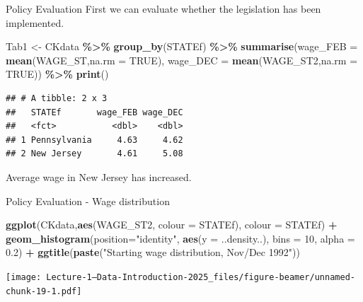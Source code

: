 \documentclass[
  ignorenonframetext,
]{beamer}
\newenvironment{Shaded}{\begin{snugshade}}{\end{snugshade}}
\newcommand{\AttributeTok}[1]{\textcolor[rgb]{0.13,0.29,0.53}{#1}}
\newcommand{\ConstantTok}[1]{\textcolor[rgb]{0.56,0.35,0.01}{#1}}
\newcommand{\DecValTok}[1]{\textcolor[rgb]{0.00,0.00,0.81}{#1}}
\newcommand{\FloatTok}[1]{\textcolor[rgb]{0.00,0.00,0.81}{#1}}
\newcommand{\FunctionTok}[1]{\textcolor[rgb]{0.13,0.29,0.53}{\textbf{#1}}}
\newcommand{\NormalTok}[1]{#1}
\newcommand{\OtherTok}[1]{\textcolor[rgb]{0.56,0.35,0.01}{#1}}
\newcommand{\SpecialCharTok}[1]{\textcolor[rgb]{0.81,0.36,0.00}{\textbf{#1}}}
\newcommand{\StringTok}[1]{\textcolor[rgb]{0.31,0.60,0.02}{#1}}
\begin{document}
\begin{frame}[fragile]{Policy Evaluation}
\label{policy-evaluation}
First we can evaluate whether the legislation has been implemented.

\footnotesize

\begin{Shaded}
\begin{Highlighting}[]
\NormalTok{Tab1 }\OtherTok{\textless{}{-}}\NormalTok{ CKdata }\SpecialCharTok{\%\textgreater{}\%} \FunctionTok{group\_by}\NormalTok{(STATEf) }\SpecialCharTok{\%\textgreater{}\%} 
          \FunctionTok{summarise}\NormalTok{(}\AttributeTok{wage\_FEB =} \FunctionTok{mean}\NormalTok{(WAGE\_ST,}\AttributeTok{na.rm =} \ConstantTok{TRUE}\NormalTok{), }
                    \AttributeTok{wage\_DEC =} \FunctionTok{mean}\NormalTok{(WAGE\_ST2,}\AttributeTok{na.rm =} \ConstantTok{TRUE}\NormalTok{)) }\SpecialCharTok{\%\textgreater{}\%} 
          \FunctionTok{print}\NormalTok{()}
\end{Highlighting}
\end{Shaded}

\begin{verbatim}
## # A tibble: 2 x 3
##   STATEf       wage_FEB wage_DEC
##   <fct>           <dbl>    <dbl>
## 1 Pennsylvania     4.63     4.62
## 2 New Jersey       4.61     5.08
\end{verbatim}

Average wage in New Jersey has increased.

\normalsize
\end{frame}

\begin{frame}[fragile]{Policy Evaluation - Wage distribution}
\label{policy-evaluation---wage-distribution}
\footnotesize

\begin{Shaded}
\begin{Highlighting}[]
\FunctionTok{ggplot}\NormalTok{(CKdata,}\FunctionTok{aes}\NormalTok{(WAGE\_ST2, }\AttributeTok{colour =}\NormalTok{ STATEf), }\AttributeTok{colour =}\NormalTok{ STATEf) }\SpecialCharTok{+} 
    \FunctionTok{geom\_histogram}\NormalTok{(}\AttributeTok{position=}\StringTok{"identity"}\NormalTok{, }
                   \FunctionTok{aes}\NormalTok{(}\AttributeTok{y =}\NormalTok{ ..density..),}
                   \AttributeTok{bins =} \DecValTok{10}\NormalTok{,}
                   \AttributeTok{alpha =} \FloatTok{0.2}\NormalTok{) }\SpecialCharTok{+}
    \FunctionTok{ggtitle}\NormalTok{(}\FunctionTok{paste}\NormalTok{(}\StringTok{"Starting wage distribution, Nov/Dec 1992"}\NormalTok{))}
\end{Highlighting}
\end{Shaded}

\texttt{[image: Lecture-1---Data-Introduction-2025\_files/figure-beamer/unnamed-chunk-19-1.pdf]}
\normalsize
\end{frame}
\end{document}

